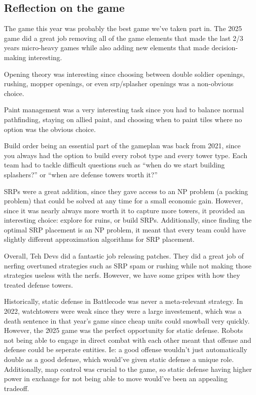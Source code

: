 \subsection{Reflection on the game}

The game this year was probably the best game we've taken part in. The 2025 game did a great job removing all of the game elements that made the last 2/3 years micro-heavy games while also adding new elements that made decision-making interesting. 

\medskip

Opening theory was interesting since choosing between double soldier openings, rushing, mopper openings, or even srp/splasher openings was a non-obvious choice. 

\medskip

Paint management was a very interesting task since you had to balance normal pathfinding, staying on allied paint, and choosing when to paint tiles where no option was the obvious choice.

\medskip

Build order being an essential part of the gameplan was back from 2021, since you always had the option to build every robot type and every tower type. Each team had to tackle difficult questions such as ``when do we start building splashers?'' or ``when are defense towers worth it?''

\medskip

SRPs were a great addition, since they gave access to an NP problem (a packing problem) that could be solved at any time for a small economic gain. However, since it was nearly always more worth it to capture more towers, it provided an interesting choice: explore for ruins, or build SRPs. Additionally, since finding the optimal SRP placement is an NP problem, it meant that every team could have slightly different approximation algorithms for SRP placement.

\medskip

Overall, Teh Devs did a fantastic job releasing patches. They did a great job of nerfing overtuned strategies such as SRP spam or rushing while not making those strategies useless with the nerfs. However, we have some gripes with how they treated defense towers. 

\medskip

Historically, static defense in Battlecode was never a meta-relevant strategy. In 2022, watchtowers were weak since they were a large investement, which was a death sentence in that year's game since cheap units could snowball very quickly. However, the 2025 game was the perfect opportunity for static defense. Robots not being able to engage in direct combat with each other meant that offense and defense could be seperate entities. Ie: a good offense wouldn't just automatically double as a good defense, which would've given static defense a unique role. Additionally, map control was crucial to the game, so static defense having higher power in exchange for not being able to move would've been an appealing tradeoff.

